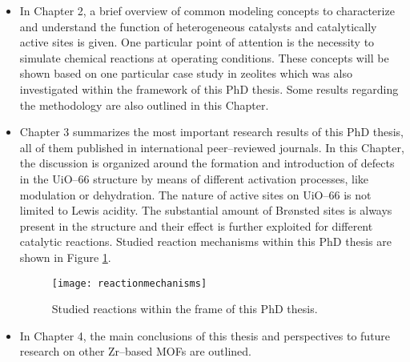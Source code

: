 \begin{itemize}
\item
In Chapter 2, a brief overview of common modeling concepts to characterize and
understand the function of heterogeneous catalysts and catalytically active
sites is given. One particular point of attention is the necessity to simulate chemical reactions at operating conditions.
These concepts will be shown based on one particular case study in zeolites
which was also investigated within the framework of this PhD thesis.
Some results
regarding the methodology are also outlined in this Chapter.
\item
Chapter 3 summarizes the most important research results of this PhD thesis, all
of them published in international peer--reviewed journals. In this Chapter, the
discussion is organized around the formation and introduction of defects in the UiO--66 structure by means of different activation
processes, like modulation or dehydration. The nature of active sites on UiO--66
is not limited to Lewis acidity. The substantial amount of Br\o{}nsted sites is
always present in the structure and their effect is further exploited
for different catalytic reactions. Studied reaction mechanisms within this
PhD thesis are shown in Figure \ref{fig:reactionmechanisms}.

\begin{figure}[!h]
	\centering
	\texttt{[image: reactionmechanisms]}
	\caption{Studied reactions within the frame of this PhD thesis.}
	\label{fig:reactionmechanisms}
\end{figure}
\item
In Chapter 4, the main conclusions of this thesis and perspectives to future
research on other Zr--based MOFs are outlined.
\end{itemize}

\clearpage{\pagestyle{empty}\cleardoublepage}
